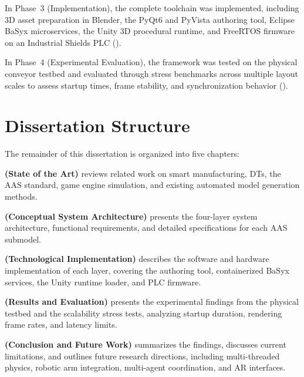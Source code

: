 In Phase~3 (Implementation), the complete toolchain was implemented, including 3D asset preparation in Blender, the PyQt6 and PyVista authoring tool, Eclipse BaSyx microservices, the Unity 3D procedural runtime, and FreeRTOS firmware on an Industrial Shields \gls{PLC} ().

In Phase~4 (Experimental Evaluation), the framework was tested on the physical conveyor testbed and evaluated through stress benchmarks across multiple layout scales to assess startup times, frame stability, and synchronization behavior ().

\section{Dissertation Structure}
\label{sec:structure}

The remainder of this dissertation is organized into five chapters:

\textbf{ (State of the Art)} reviews related work on smart manufacturing, \glspl{DT}, the \gls{AAS} standard, game engine simulation, and existing automated model generation methods.

\textbf{ (Conceptual System Architecture)} presents the four-layer system architecture, functional requirements, and detailed specifications for each \gls{AAS} submodel.

\textbf{ (Technological Implementation)} describes the software and hardware implementation of each layer, covering the authoring tool, containerized BaSyx services, the Unity runtime loader, and \gls{PLC} firmware.

\textbf{ (Results and Evaluation)} presents the experimental findings from the physical testbed and the scalability stress tests, analyzing startup duration, rendering frame rates, and latency limits.

\textbf{ (Conclusion and Future Work)} summarizes the findings, discusses current limitations, and outlines future research directions, including multi-threaded physics, robotic arm integration, multi-agent coordination, and \gls{AR} interfaces.
